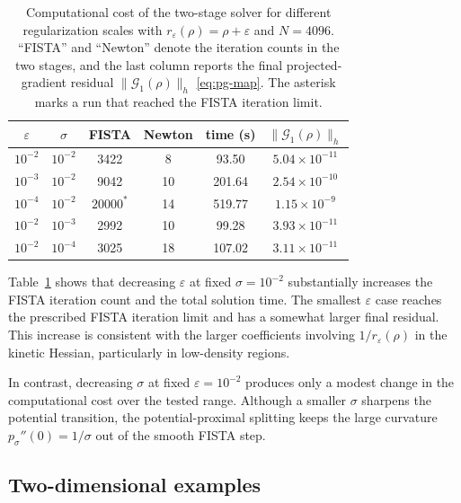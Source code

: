 \documentclass[11pt]{article}
\newcommand{\eps}{\varepsilon}
\newcommand{\sig}{\sigma}
\theoremstyle{plain}
\theoremstyle{definition}
\numberwithin{equation}{section}
\begin{document}
\begin{table}[H]
\centering
\caption{
Computational cost of the two-stage solver for different
regularization scales with $r_\eps(\rho)=\rho+\eps$ and $N=4096$.
``FISTA'' and ``Newton'' denote the iteration counts in the two
stages, and the last column reports the final projected-gradient
residual $\|\mathcal G_1(\rho)\|_h$ \eqref{eq:pg-map}.
The asterisk marks a run that reached the FISTA iteration limit.
}
\label{tab:solver-regularization-cost}
\begin{tabular}{cccccc}
\toprule
$\eps$ & $\sig$
& FISTA & Newton
& time (s) & $\|\mathcal G_1(\rho)\|_h$ \\
\midrule
$10^{-2}$ & $10^{-2}$ & 3422 & 8
& 93.50 & $5.04\times10^{-11}$ \\
$10^{-3}$ & $10^{-2}$ & 9042 & 10
& 201.64 & $2.54\times10^{-10}$ \\
$10^{-4}$ & $10^{-2}$ & $20000^*$ & 14
& 519.77 & $1.15\times10^{-9}$ \\
\midrule
$10^{-2}$ & $10^{-3}$ & 2992 & 10
& 99.28 & $3.93\times10^{-11}$ \\
$10^{-2}$ & $10^{-4}$ & 3025 & 18
& 107.02 & $3.11\times10^{-11}$ \\
\bottomrule
\end{tabular}
\end{table}




Table~\ref{tab:solver-regularization-cost} shows that decreasing
$\eps$ at fixed $\sig=10^{-2}$ substantially increases the FISTA
iteration count and the total solution time. The smallest $\eps$
case reaches the prescribed FISTA iteration limit and has a somewhat
larger final residual. This increase is consistent with the larger
coefficients involving $1/r_\eps(\rho)$ in the kinetic Hessian,
particularly in low-density regions.

In contrast, decreasing $\sig$ at fixed $\eps=10^{-2}$ produces only
a modest change in the computational cost over the tested range.
Although a smaller $\sig$ sharpens the potential transition, the
potential-proximal splitting keeps the large curvature
$p_\sig''(0)=1/\sig$ out of the smooth FISTA step.


\subsection{Two-dimensional examples}
\label{subsec:num-2d}
\end{document}
